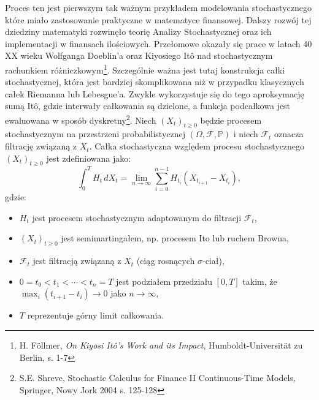 Proces ten jest pierwszym tak ważnym przykładem modelowania stochastycznego które miało zastosowanie praktyczne w matematyce finansowej. Dalszy rozwój tej dziedziny matematyki rozwinęło teorię Analizy Stochastycznej oraz ich implementacji w finansach ilościowych. Przełomowe okazały się prace w latach 40 XX wieku Wolfganga Doeblin'a oraz Kiyosiego Itô nad stochastycznym rachunkiem różniczkowym\footnote{H. Föllmer, \textit{On Kiyosi Itô's Work and its Impact}, Humboldt-Universität zu Berlin, s. 1-7}. Szczególnie ważna jest tutaj konstrukcja całki stochastycznej, która jest bardziej skomplikowana niż w przypadku klasycznych całek Riemanna lub Lebesgue’a. Zwykle wykorzystuje się do tego aproksymację sumą Itô, gdzie interwały całkowania są dzielone, a funkcja podcałkowa jest ewaluowana w sposób dyskretny\footnote{S.E. Shreve, Stochastic Calculus for Finance II Continuous-Time Models, Springer, Nowy Jork 2004 s. 125-128 }.
Niech \( (X_t)_{t \geq 0} \) będzie procesem stochastycznym na przestrzeni probabilistycznej \( (\Omega, \mathcal{F}, \mathbb{P}) \) i niech \( \mathcal{F}_t \) oznacza filtrację związaną z \( X_t \). Całka stochastyczna względem procesu stochastycznego \((X_t)_{t \geq 0}\) jest zdefiniowana jako:
\begin{equation}
\int_0^T H_t \, dX_t = \lim_{n \to \infty} \sum_{i=0}^{n-1} H_{t_i} (X_{t_{i+1}} - X_{t_i}),
\end{equation}
gdzie:
\begin{itemize}
  \item \(H_t\) jest procesem stochastycznym adaptowanym do filtracji \(\mathcal{F}_t\),
  \item \( (X_t)_{t \geq 0} \) jest semimartingałem, np. procesem Ito lub ruchem Browna,
  \item \( \mathcal{F}_t \) jest filtracją związaną z \( X_t \) (ciąg rosnących \(\sigma\)-ciał),
  \item \(0 = t_0 < t_1 < \cdots < t_n = T\) jest podziałem przedziału \([0, T]\) takim, że \(\max_i (t_{i+1} - t_i) \to 0\) jako \(n \to \infty\),
  \item \(T\) reprezentuje górny limit całkowania.
\end{itemize}

